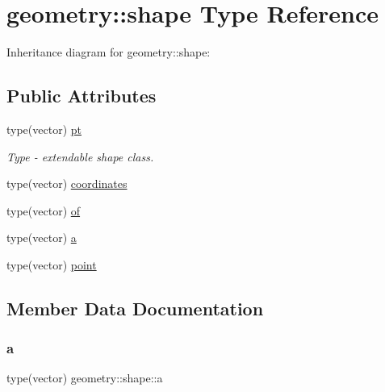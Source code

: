 \hypertarget{structgeometry_1_1shape}{}\section{geometry\+:\+:shape Type Reference}
\label{structgeometry_1_1shape}


Inheritance diagram for geometry\+:\+:shape\+:
\subsection*{Public Attributes}
\begin{DoxyCompactItemize}
\item 
type(vector) \mbox{\hyperlink{structgeometry_1_1shape_aada595aa3503cf22350737caf2931e6a}{pt}}
\begin{DoxyCompactList}\small\item\em Type -\/ extendable shape class. \end{DoxyCompactList}\item 
type(vector) \mbox{\hyperlink{structgeometry_1_1shape_ae31a17702996581b8a7d9f0b601e426e}{coordinates}}
\item 
type(vector) \mbox{\hyperlink{structgeometry_1_1shape_a00023e2069f5764880267801959ecb30}{of}}
\item 
type(vector) \mbox{\hyperlink{structgeometry_1_1shape_a16013638e58225ff4d6ad562713d5db8}{a}}
\item 
type(vector) \mbox{\hyperlink{structgeometry_1_1shape_a56d125828996ab14b6eb030cac6d242f}{point}}
\end{DoxyCompactItemize}


\subsection{Member Data Documentation}
\mbox{\label{structgeometry_1_1shape_a16013638e58225ff4d6ad562713d5db8}} 
\subsubsection{\texorpdfstring{a}{a}}
{\footnotesize\ttfamily type(vector) geometry\+::shape\+::a}

\mbox{\label{structgeometry_1_1shape_ae31a17702996581b8a7d9f0b601e426e}} 
